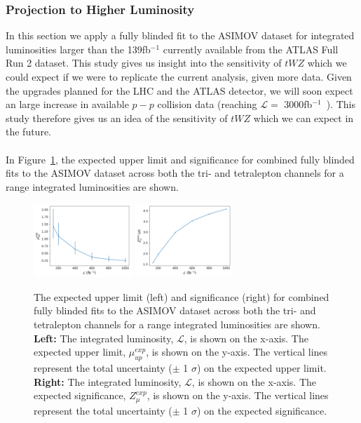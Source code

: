 \subsubsection{Projection to Higher Luminosity}

In this section we apply a fully blinded fit to the ASIMOV dataset for integrated luminosities larger than the 139fb$^{-1}$ currently available from the ATLAS Full Run 2 dataset. This study gives us insight into the sensitivity of $tWZ$ which we could expect if we were to replicate the current analysis, given more data. Given the upgrades planned for the LHC and the ATLAS detector, we will soon expect an large increase in available $p-p$ collision data (reaching $\mathcal{L} =$ 3000fb$^{-1}$~\cite{HL-LHC-paper}). This study therefore gives us an idea of the sensitivity of $tWZ$ which we can expect in the future. \\\\

In Figure~\ref{fig:limit-sig-projection}, the expected upper limit and significance for combined fully blinded fits to the ASIMOV dataset across both the tri- and tetralepton channels for a range integrated luminosities are shown.

\begin{figure}
    \centering
    \includegraphics[width=0.33\textwidth]{figures/combined/exp_upper.png}
    \includegraphics[width=0.33\textwidth]{figures/combined/signif.png}
    \caption{The expected upper limit (left) and significance (right) for combined fully blinded fits to the ASIMOV dataset across both the tri- and tetralepton channels for a range integrated luminosities are shown. \textbf{Left: }The integrated luminosity, $\mathcal{L}$, is shown on the x-axis. The expected upper limit, $\mu_{up}^{exp}$, is shown on the y-axis. The vertical lines represent the total uncertainty ($\pm$ 1 $\sigma$) on the expected upper limit. \textbf{Right: }The integrated luminosity, $\mathcal{L}$, is shown on the x-axis. The expected significance, $Z_{\mu}^{exp}$, is shown on the y-axis. The vertical lines represent the total uncertainty ($\pm$ 1 $\sigma$) on the expected significance.}
    \label{fig:limit-sig-projection}
\end{figure}

